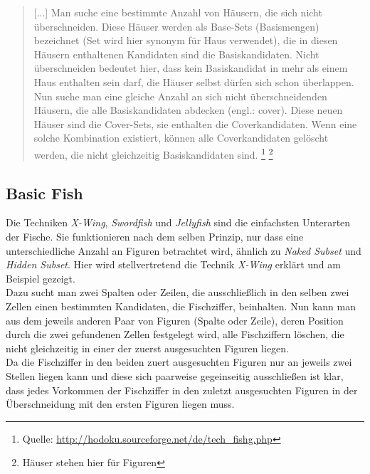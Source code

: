 \documentclass[accentcolor=tud6b,11pt,paper=a4]{tudreport}
\begin{document}
\begin{quote}[...] Man suche eine bestimmte Anzahl von Häusern, die sich nicht überschneiden. Diese Häuser werden als Base-Sets (Basismengen) bezeichnet (Set wird hier synonym für Haus verwendet), die in diesen Häusern enthaltenen Kandidaten sind die Basiskandidaten. Nicht überschneiden bedeutet hier, dass kein Basiskandidat in mehr als einem Haus enthalten sein darf, die Häuser selbst dürfen sich schon überlappen. Nun suche man eine gleiche Anzahl an sich nicht überschneidenden Häusern, die alle Basiskandidaten abdecken (engl.: cover). Diese neuen Häuser sind die Cover-Sets, sie enthalten die Coverkandidaten. Wenn eine solche Kombination existiert, können alle Coverkandidaten gelöscht werden, die nicht gleichzeitig Basiskandidaten sind.
\footnote{Quelle: \url{http://hodoku.sourceforge.net/de/tech_fishg.php}}
\footnote{Häuser stehen hier für Figuren}
\end{quote}


\newpage
\subsection{Basic Fish}
Die Techniken \textit{X-Wing}, \textit{Swordfish} und \textit{Jellyfish} sind die einfachsten Unterarten der Fische. Sie funktionieren nach dem selben Prinzip, nur dass eine unterschiedliche Anzahl an Figuren betrachtet wird, ähnlich zu \textit{Naked Subset} und \textit{Hidden Subset}. Hier wird stellvertretend die Technik \textit{X-Wing} erklärt und am Beispiel gezeigt.\\
Dazu sucht man zwei Spalten oder Zeilen, die ausschließlich in den selben zwei Zellen einen bestimmten Kandidaten, die Fischziffer, beinhalten. Nun kann man aus dem jeweils anderen Paar von Figuren (Spalte oder Zeile), deren Position durch die zwei gefundenen Zellen festgelegt wird, alle Fischziffern löschen, die nicht gleichzeitig in einer der zuerst ausgesuchten Figuren liegen.\\
Da die Fischziffer in den beiden zuert ausgesuchten Figuren nur an jeweils zwei Stellen liegen kann und diese sich paarweise gegeinseitig ausschließen ist klar, dass jedes Vorkommen der Fischziffer in den zuletzt ausgesuchten Figuren in der Überschneidung mit den ersten Figuren liegen muss.
\end{document}
